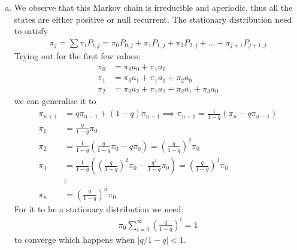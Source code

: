 \documentclass[a4paper,10pt]{article}
\theoremstyle{definition}
\begin{document}
\begin{enumerate}
\begin{enumerate}[(a)]
\item We observe that this Markov chain is irreducible and aperiodic, thus all the states are either positive or null recurrent. The stationary distribution need to satisfy
\begin{align*}
\pi_j=\sum\pi_iP_{i,j}=\pi_0P_{0,j}+\pi_1P_{1,j}+\pi_2P_{2,j}+\ldots+\pi_{j+1}P_{j+1,j}
\end{align*}
Trying out for the first few values:
\begin{align*}
\pi_0 &=  \pi_0a_{0}+\pi_1a_{0}\\
\pi_1 &= \pi_0a_1 +\pi_1a_1  +\pi_2a_0 \\
\pi_2 &= \pi_0a_2 + \pi_1a_2 + \pi_2a_1+ \pi_3a_0
\end{align*}
we can generalise it to 
\begin{align*}
\pi_{n+1}&=q\pi_{n-1}+(1-q)\pi_{n+1}\implies \pi_{n+1}=\frac{1}{1-q}(\pi_n-q\pi_{n-1})\\
\pi_1&=\frac{q}{1-q}\pi_0\\
\pi_2&=\frac{1}{1-q}\left(\frac{q}{1-q}\pi_0-q\pi_0\right)=\left(\frac{q}{1-q}\right)^2\pi_0\\
\pi_3&=\frac{1}{1-q}\left(\left(\frac{q}{1-q}\right)^2\pi_0-\frac{q^2}{1-q}\pi_0\right)=\left(\frac{q}{1-q}\right)^3\pi_0\\
&\vdots\\
\pi_n&=\left(\frac{q}{1-q}\right)^n\pi_0
\end{align*}
For it to be a stationary distribution we need:
\begin{align*}
\pi_0\sum_{i=0}^{\infty}\left(\frac{q}{1-q}\right)^i=1
\end{align*}
to converge which happens when $|q/1-q|<1$.
\end{enumerate}
\end{enumerate}
\end{document}
